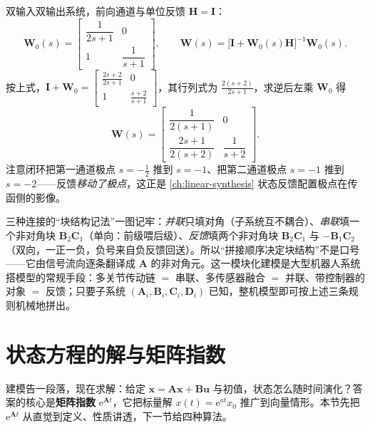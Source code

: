 \begin{example}\label{ex:ssb-conn-feedback}
双输入双输出系统，前向通道与单位反馈 $\mathbf{H}=\mathbf{I}$\cite{zhang2017modern}：
\[
  \mathbf{W}_0(s)=\begin{bmatrix}\dfrac{1}{2s+1}&0\\[6pt]1&\dfrac{1}{s+1}\end{bmatrix},\qquad
  \mathbf{W}(s)=\big[\mathbf{I}+\mathbf{W}_0(s)\mathbf{H}\big]^{-1}\mathbf{W}_0(s).
\]
按上式，$\mathbf{I}+\mathbf{W}_0=\begin{bmatrix}\frac{2s+2}{2s+1}&0\\1&\frac{s+2}{s+1}\end{bmatrix}$，其行列式为 $\frac{2(s+2)}{2s+1}$，求逆后左乘 $\mathbf{W}_0$ 得
\[
  \mathbf{W}(s)=\begin{bmatrix}\dfrac{1}{2(s+1)}&0\\[6pt]\dfrac{2s+1}{2(s+2)}&\dfrac{1}{s+2}\end{bmatrix}.
\]
注意闭环把第一通道极点 $s=-\tfrac12$ 推到 $s=-1$、把第二通道极点 $s=-1$ 推到 $s=-2$——反馈\emph{移动了极点}，这正是 \cref{ch:linear-synthesis} 状态反馈配置极点在传函侧的影像。
\end{example}

\begin{insight}
三种连接的“块结构记法”一图记牢：\emph{并联}只填对角（子系统互不耦合）、\emph{串联}填一个非对角块 $\mathbf{B}_2\mathbf{C}_1$（单向：前级喂后级）、\emph{反馈}填两个非对角块 $\mathbf{B}_2\mathbf{C}_1$ 与 $-\mathbf{B}_1\mathbf{C}_2$（双向，一正一负，负号来自负反馈回送）。所以“拼接顺序决定块结构”不是口号——它由信号流向逐条翻译成 $\mathbf{A}$ 的非对角元。这一模块化建模是大型机器人系统搭模型的常规手段：多关节传动链 $=$ 串联、多传感器融合 $=$ 并联、带控制器的对象 $=$ 反馈；只要子系统 $(\mathbf{A}_i,\mathbf{B}_i,\mathbf{C}_i,\mathbf{D}_i)$ 已知，整机模型即可按上述三条规则机械地拼出。
\end{insight}

\section{状态方程的解与矩阵指数}
\label{sec:ssb-expm}

建模告一段落，现在求解：给定 $\dot{\mathbf{x}}=\mathbf{A}\mathbf{x}+\mathbf{B}\mathbf{u}$ 与初值，状态怎么随时间演化？答案的核心是\textbf{矩阵指数} $\mathrm{e}^{\mathbf{A}t}$，它把标量解 $x(t)=\mathrm{e}^{at}x_0$ 推广到向量情形。本节先把 $\mathrm{e}^{\mathbf{A}t}$ 从直觉到定义、性质讲透，下一节给四种算法。


